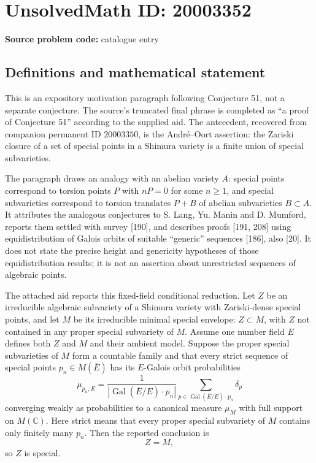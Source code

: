 \documentclass[11pt]{article}
\newcommand{\C}{\mathbb{C}}
\begin{document}
\section*{UnsolvedMath ID: 20003352}
\textbf{Source problem code:} catalogue entry
\subsection{Definitions and mathematical statement}
This is an expository motivation paragraph following Conjecture 51, not a separate conjecture. The source's truncated final phrase is completed as ``a proof of Conjecture 51'' according to the supplied aid. The antecedent, recovered from companion permanent ID $20003350$, is the Andr\'e--Oort assertion: the Zariski closure of a set of special points in a Shimura variety is a finite union of special subvarieties.

The paragraph draws an analogy with an abelian variety $A$: special points correspond to torsion points $P$ with $nP=0$ for some $n\ge1$, and special subvarieties correspond to torsion translates $P+B$ of abelian subvarieties $B\subset A$. It attributes the analogous conjectures to S. Lang, Yu. Manin and D. Mumford, reports them settled with survey [190], and describes proofs [191, 208] using equidistribution of Galois orbits of suitable ``generic'' sequences [186], also [20]. It does not state the precise height and genericity hypotheses of those equidistribution results; it is not an assertion about unrestricted sequences of algebraic points.

The attached aid reports this fixed-field conditional reduction. Let $Z$ be an irreducible algebraic subvariety of a Shimura variety with Zariski-dense special points, and let $M$ be its irreducible minimal special envelope: $Z\subset M$, with $Z$ not contained in any proper special subvariety of $M$. Assume one number field $E$ defines both $Z$ and $M$ and their ambient model. Suppose the proper special subvarieties of $M$ form a countable family and that every strict sequence of special points $p_n\in M(\overline E)$ has its $E$-Galois orbit probabilities
\[
 \mu_{p_n,E}=\frac1{|\operatorname{Gal}(\overline E/E)\cdot p_n|}
 \sum_{p\in\operatorname{Gal}(\overline E/E)\cdot p_n}\delta_p
\]
converging weakly as probabilities to a canonical measure $\mu_M$ with full support on $M(\C)$. Here strict means that every proper special subvariety of $M$ contains only finitely many $p_n$. Then the reported conclusion is
\[
 Z=M,
\]
so $Z$ is special.
\end{document}
